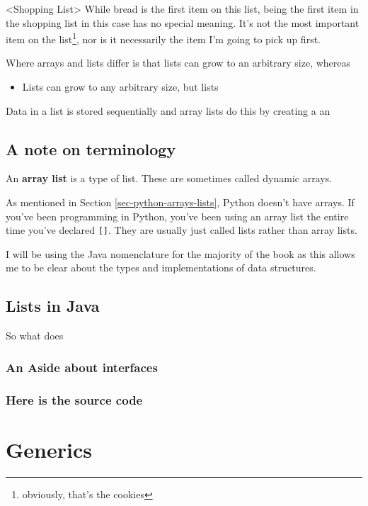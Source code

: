 <Shopping List>
While bread is the first item on this list, being the first item in the shopping list in this case has no special meaning.  It's not the most important item on the list\footnote{obviously, that's the cookies}, nor is it necessarily the item I'm going to pick up first.

Where arrays and lists differ is that lists can grow to an arbitrary size, whereas

\begin{itemize}
	\item Lists can grow to any arbitrary size, but lists  
\end{itemize}

Data in a list is stored sequentially and array lists do this by creating a an 


\subsection{A note on terminology}
An \textbf{array list} is a type of list.  These are sometimes called dynamic arrays.

As mentioned in Section \ref{sec-python-arrays-lists}, Python doesn't have arrays.  If you've been programming in Python, you've been using an array list the entire time you've declared \texttt{[]}.  They are usually just called lists rather than array lists.


I will be using the Java nomenclature for the majority of the book as this allows me to be clear about the types and implementations of data structures.

\subsection{Lists in Java}

So what does

\subsubsection{An Aside about interfaces}
\subsubsection*{Here is the source code}



\section{Generics}

